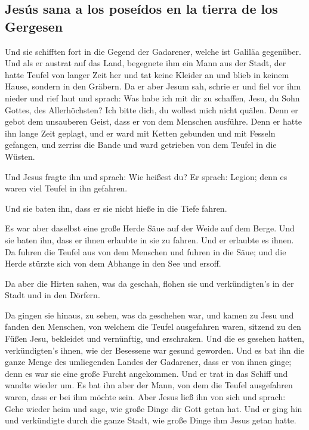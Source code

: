 \hypertarget{jesuxfas-sana-a-los-poseuxeddos-en-la-tierra-de-los-gergesen}{%
\subsection{Jesús sana a los poseídos en la tierra de los
Gergesen}\label{jesuxfas-sana-a-los-poseuxeddos-en-la-tierra-de-los-gergesen}}

 Und sie schifften fort in die Gegend der Gadarener,
welche ist Galiläa gegenüber.  Und als er austrat auf das
Land, begegnete ihm ein Mann aus der Stadt, der hatte Teufel von langer
Zeit her und tat keine Kleider an und blieb in keinem Hause, sondern in
den Gräbern.  Da er aber Jesum sah, schrie er und fiel
vor ihm nieder und rief laut und sprach: Was habe ich mit dir zu
schaffen, Jesu, du Sohn Gottes, des Allerhöchsten? Ich bitte dich, du
wollest mich nicht quälen.  Denn er gebot dem unsauberen
Geist, dass er von dem Menschen ausführe. Denn er hatte ihn lange Zeit
geplagt, und er ward mit Ketten gebunden und mit Fesseln gefangen, und
zerriss die Bande und ward getrieben von dem Teufel in die Wüsten.

 Und Jesus fragte ihn und sprach: Wie heißest du? Er
sprach: Legion; denn es waren viel Teufel in ihn gefahren.

 Und sie baten ihn, dass er sie nicht hieße in die Tiefe
fahren.

 Es war aber daselbst eine große Herde Säue auf der Weide
auf dem Berge. Und sie baten ihn, dass er ihnen erlaubte in sie zu
fahren. Und er erlaubte es ihnen.  Da fuhren die Teufel
aus von dem Menschen und fuhren in die Säue; und die Herde stürzte sich
von dem Abhange in den See und ersoff.

 Da aber die Hirten sahen, was da geschah, flohen sie und
verkündigten's in der Stadt und in den Dörfern.

 Da gingen sie hinaus, zu sehen, was da geschehen war,
und kamen zu Jesu und fanden den Menschen, von welchem die Teufel
ausgefahren waren, sitzend zu den Füßen Jesu, bekleidet und vernünftig,
und erschraken.  Und die es gesehen hatten,
verkündigten's ihnen, wie der Besessene war gesund geworden.
 Und es bat ihn die ganze Menge des umliegenden Landes
der Gadarener, dass er von ihnen ginge; denn es war sie eine große
Furcht angekommen. Und er trat in das Schiff und wandte wieder um.
 Es bat ihn aber der Mann, von dem die Teufel ausgefahren
waren, dass er bei ihm möchte sein. Aber Jesus ließ ihn von sich und
sprach:  Gehe wieder heim und sage, wie große Dinge dir
Gott getan hat. Und er ging hin und verkündigte durch die ganze Stadt,
wie große Dinge ihm Jesus getan hatte.

